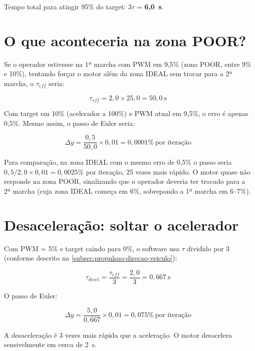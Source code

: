 Tempo total para atingir 95\% do target: $3\tau$ = \textbf{6,0~s}.

\section*{O que aconteceria na zona POOR?}

Se o operador estivesse na 1ª marcha com PWM em 9,5\% (zona POOR, entre 9\% e 10\%), tentando forçar o motor além da zona IDEAL sem trocar para a 2ª marcha, o $\tau_{eff}$ seria:

\begin{equation*}
	\tau_{eff} = 2{,}0 \times 25{,}0 = 50{,}0~\text{s}
\end{equation*}

Com target em 10\% (acelerador a 100\%) e PWM atual em 9,5\%, o erro é apenas 0,5\%. Mesmo assim, o passo de Euler seria:

\begin{equation*}
	\Delta y = \frac{0{,}5}{50{,}0} \times 0{,}01 = 0{,}0001\%~\text{por iteração}
\end{equation*}

Para comparação, na zona IDEAL com o mesmo erro de 0,5\% o passo seria $0{,}5 / 2{,}0 \times 0{,}01 = 0{,}0025\%$ por iteração, 25 vezes mais rápido. O motor quase não responde na zona POOR, sinalizando que o operador deveria ter trocado para a 2ª marcha (cuja zona IDEAL começa em 6\%, sobrepondo a 1ª marcha em 6--7\%).

\section*{Desaceleração: soltar o acelerador}

Com PWM = 5\% e target caindo para 0\%, o software usa $\tau$ dividido por 3 (conforme descrito na \autoref{subsec:propulsao-direcao-veiculo}):

\begin{equation*}
	\tau_{decel} = \frac{\tau_{eff}}{3} = \frac{2{,}0}{3} = 0{,}667~\text{s}
\end{equation*}

O passo de Euler:

\begin{equation*}
	\Delta y = \frac{5{,}0}{0{,}667} \times 0{,}01 = 0{,}075\%~\text{por iteração}
\end{equation*}

A desaceleração é 3 vezes mais rápida que a aceleração. O motor desacelera sensivelmente em cerca de 2~s.

